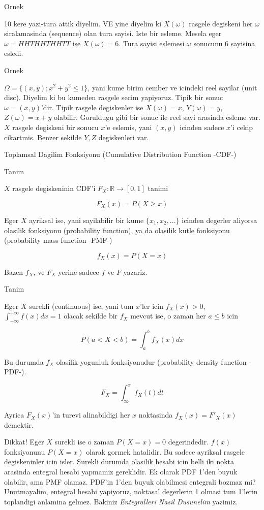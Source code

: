 \documentclass[12pt,fleqn]{article}
\begin{document}
Ornek

10 kere yazi-tura attik diyelim. VE yine diyelim ki $X(\omega)$ rasgele
degiskeni her $\omega$ siralamasinda (sequence) olan tura sayisi. Iste bir
esleme. Mesela eger $\omega = HHTHHTHHTT$ ise $X(\omega) = 6$. Tura sayisi
eslemesi $\omega$ sonucunu 6 sayisina esledi. 

Ornek 

$\Omega = \{ (x,y); x^2+y^2 \le 1 \}$, yani kume birim cember ve icindeki
reel sayilar (unit disc). Diyelim ki bu kumeden rasgele secim
yapiyoruz. Tipik bir sonuc $\omega = (x,y)$'dir. Tipik rasgele degiskenler
ise $X(\omega) = x$, $Y(\omega) = y$, $Z(\omega) = x+y$ olabilir. Goruldugu
gibi bir sonuc ile reel sayi arasinda esleme var. $X$ rasgele degiskeni
bir sonucu $x$'e eslemis, yani $(x,y)$ icinden sadece $x$'i cekip
cikartmis. Benzer sekilde $Y,Z$ degiskenleri var. 

Toplamsal Dagilim Fonksiyonu (Cumulative Distribution Function -CDF-)

Tanim

$X$ rasgele degiskeninin CDF'i $F_X: \mathbb{R} \to [0,1]$ tanimi

\[ F_X(x) = P(X \ge x) \]

Eger $X$ ayriksal ise, yani sayilabilir bir kume $\{x_1,x_2,...\}$ icinden
degerler aliyorsa olasilik fonksiyonu (probability function), ya da
olasilik kutle fonksiyonu (probability mass function -PMF-) 

\[ f_X(x) = P(X = x) \]

Bazen $f_X$, ve $F_X$ yerine sadece $f$ ve $F$ yazariz. 

Tanim

Eger $X$ surekli (continuous) ise, yani tum $x$'ler icin $f_X(x) > 0$,
$\int_{-\infty}^{+\infty}f(x) dx = 1$ olacak sekilde bir $f_X$ mevcut ise, o zaman her $a \le b$ icin

\[ P(a<X<b) = \int_{a}^{b}f_X(x)dx \]

Bu durumda $f_X$ olasilik yogunluk fonksiyonudur (probability density function
-PDF-). 

\[ F_X = \int_{\infty}^{x}f_X(t)dt \]

Ayrica $F_X(x)$'in turevi alinabildigi her $x$ noktasinda  $f_X(x) = F'_X(x)$
demektir. 

Dikkat! Eger $X$ surekli ise o zaman $P(X = x) = 0$ degerindedir. $f(x)$
fonksiyonunu $P(X=x)$ olarak gormek hatalidir. Bu sadece ayriksal rasgele
degiskeninler icin isler. Surekli durumda olasilik hesabi icin belli iki
nokta arasinda entegral hesabi yapmamiz gereklidir. Ek olarak PDF 1'den
buyuk olabilir, ama PMF olamaz. PDF'in 1'den buyuk olabilmesi entegrali
bozmaz mi? Unutmayalim, entegral hesabi yapiyoruz, noktasal degerlerin 1
olmasi tum 1'lerin toplandigi anlamina gelmez. Bakiniz {\em Entegralleri
  Nasil Dusunelim} yazimiz.
\end{document}
